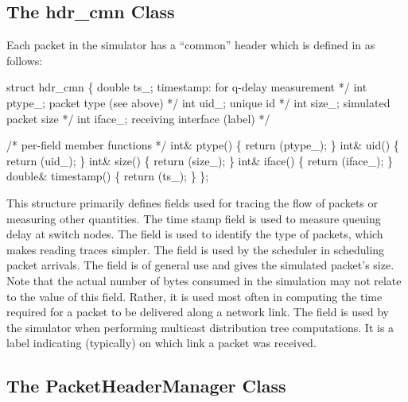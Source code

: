 \subsection{The hdr\_cmn Class}
\label{sec:commonhdr}

Each packet in the simulator has a ``common''
header which is defined in  as follows:
\begin{program}
        struct hdr_cmn \{
                double  ts_;            \* timestamp: for q-delay measurement */
                int     ptype_;         \* packet type (see above) */
                int     uid_;           \* unique id */
                int     size_;          \* simulated packet size */
                int     iface_;         \* receiving interface (label) */
         
                /* {\cf per-field member functions} */
                int& ptype() \{ return (ptype_); \}
                int& uid() \{ return (uid_); \}
                int& size() \{ return (size_); \}
                int& iface() \{ return (iface_); \}
                double& timestamp() \{ return (ts_); \}
        \};
\end{program}
This structure primarily defines fields used for tracing
the flow of packets or measuring other quantities.
The time stamp field is used to measure queuing delay
at switch nodes.
The  field is used to identify the
type of packets, which makes reading traces simpler.
The  field is used by the scheduler in scheduling
packet arrivals.
The  field is of general use and gives the
simulated packet's size.
Note that the actual number of bytes consumed in the simulation
may not relate to the value of this field.
Rather, it is used most often in computing the time required for a packet
to be delivered along a network link.
The  field is used by the simulator when performing
multicast distribution tree computations.
It is a label indicating (typically) on which link a packet was received.

\subsection{The PacketHeaderManager Class}
\label{sec:packethdrmgr}

